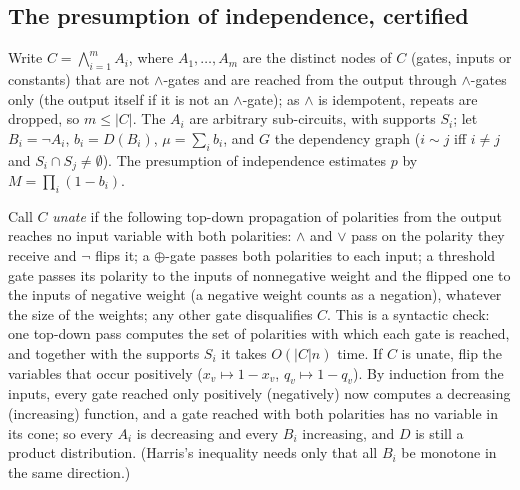 \subsection{The presumption of independence, certified}\label{sec:independence}

Write $C=\bigwedge_{i=1}^mA_i$, where $A_1,\dots,A_m$ are the distinct nodes of $C$
(gates, inputs or constants) that are not $\wedge$-gates and are reached from the
output through $\wedge$-gates only (the output itself if it is not an $\wedge$-gate); as
$\wedge$ is idempotent, repeats are dropped, so $m\le|C|$. The $A_i$ are arbitrary
sub-circuits, with supports $S_i$; let $B_i=\neg A_i$, $b_i=D(B_i)$, $\mu=\sum_ib_i$,
and $G$ the dependency graph ($i\sim j$ iff $i\ne j$ and $S_i\cap S_j\ne\emptyset$).
The presumption of independence estimates $p$ by $M=\prod_i(1-b_i)$.

Call $C$ \emph{unate} if the following top-down propagation of polarities from
the output reaches no input variable with both polarities: $\wedge$ and $\vee$ pass on the polarity they receive and $\neg$ flips it; a
$\oplus$-gate passes both polarities to each input; a threshold gate passes its
polarity to the inputs of nonnegative weight and the flipped one to the inputs of
negative weight (a negative weight counts as a negation), whatever the size of the
weights; any other gate disqualifies $C$. This is a syntactic check: one top-down
pass computes the set of polarities with which each gate is reached, and together
with the supports $S_i$ it takes $O(|C|n)$ time. If $C$ is unate, flip the variables
that occur positively ($x_v\mapsto1-x_v$, $q_v\mapsto1-q_v$). By induction from the
inputs, every gate reached only positively (negatively) now computes a decreasing
(increasing) function, and a gate reached with both polarities has no variable in its
cone; so every $A_i$ is decreasing and every $B_i$ increasing, and $D$ is still a
product distribution. (Harris's inequality needs only that all $B_i$ be monotone in the same
direction.)

